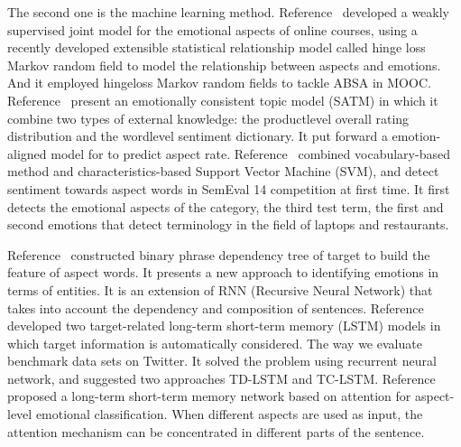 \documentclass{ieeeaccess}
\begin{document}
The second one is the machine learning method. Reference~\cite{DBLP:conf/acl/RameshKFG15} developed a weakly supervised joint model for the emotional aspects of online courses, using a recently developed extensible statistical relationship model called hinge loss Markov random field to model the relationship between aspects and emotions. And it employed hingeloss Markov random fields to tackle ABSA in MOOC. Reference~\cite{DBLP:conf/emnlp/WangE14} present an emotionally consistent topic model (SATM) in which it combine two types of external knowledge: the productlevel overall rating distribution and the wordlevel sentiment dictionary. It put forward a emotion-aligned model for to predict aspect rate. Reference~\cite{DBLP:conf/semeval/KiritchenkoZCM14} combined vocabulary-based method and characteristics-based Support Vector Machine (SVM), and  detect sentiment towards aspect words in SemEval 14 competition at first time. It first detects the emotional aspects of the category, the third test term, the first and second emotions that detect terminology in the field of laptops and restaurants. 

Reference~\cite{DBLP:conf/emnlp/NguyenS15} constructed binary phrase dependency tree of target to build the feature of aspect words. It presents a new approach to identifying emotions in terms of entities. It is an extension of RNN (Recursive Neural Network) that takes into account the dependency and composition of sentences. Reference~\cite{DBLP:conf/coling/TangQFL16} developed two target-related long-term short-term memory (LSTM) models in which target information is automatically considered. The way we evaluate benchmark data sets on Twitter. It solved the problem using recurrent neural network, and suggested two approaches TD-LSTM and TC-LSTM. Reference~\cite{DBLP:conf/emnlp/WangHZZ16} proposed a long-term short-term memory network based on attention for aspect-level emotional classification. When different aspects are used as input, the attention mechanism can be concentrated in different parts of the sentence.
\end{document}
